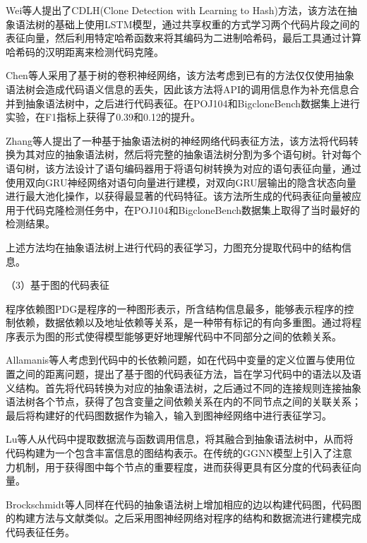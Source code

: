 Wei等人\cite{10.5555/3172077.3172312}提出了CDLH(Clone Detection with Learning to Hash)方法，该方法在抽象语法树的基础上使用LSTM模型，通过共享权重的方式学习两个代码片段之间的表征向量，然后利用特定哈希函数来将其编码为二进制哈希码，最后工具通过计算哈希码的汉明距离来检测代码克隆。

Chen等人\cite{10.1145/3310273.3321560}采用了基于树的卷积神经网络，该方法考虑到已有的方法仅仅使用抽象语法树会造成代码语义信息的丢失，因此该方法将API的调用信息作为补充信息合并到抽象语法树中，之后进行代码表征。在POJ104\cite{WOS:000485474201046}和BigcloneBench\cite{7332459}数据集上进行实验，在F1指标上获得了0.39和0.12的提升。

Zhang等人\cite{8812062}提出了一种基于抽象语法树的神经网络代码表征方法，该方法将代码转换为其对应的抽象语法树，然后将完整的抽象语法树分割为多个语句树。针对每个语句树，该方法设计了语句编码器用于将语句树转换为对应的语句表征向量，通过使用双向GRU神经网络对语句向量进行建模，对双向GRU层输出的隐含状态向量进行最大池化操作，以获得最显著的代码特征。该方法所生成的代码表征向量被应用于代码克隆检测任务中，在POJ104\cite{WOS:000485474201046}和BigcloneBench\cite{7332459}数据集上取得了当时最好的检测结果。

上述方法均在抽象语法树上进行代码的表征学习，力图充分提取代码中的结构信息。

（3）基于图的代码表征

程序依赖图PDG是程序的一种图形表示，所含结构信息最多，能够表示程序的控制依赖，数据依赖以及地址依赖等关系，是一种带有标记的有向多重图。通过将程序表示为图的形式使得模型能够更好地理解代码中不同部分之间的依赖关系。

Allamanis等人\cite{Allamanis2017LearningTR}考虑到代码中的长依赖问题，如在代码中变量的定义位置与使用位置之间的距离问题，提出了基于图的代码表征方法，旨在学习代码中的语法以及语义结构。首先将代码转换为对应的抽象语法树，之后通过不同的连接规则连接抽象语法树各个节点，获得了包含变量之间依赖关系在内的不同节点之间的关联关系；最后将构建好的代码图数据作为输入，输入到图神经网络中进行表征学习。

Lu等人\cite{Lu2019ProgramCU}从代码中提取数据流与函数调用信息，将其融合到抽象语法树中，从而将代码构建为一个包含丰富信息的图结构表示。在传统的GGNN模型上引入了注意力机制，用于获得图中每个节点的重要程度，进而获得更具有区分度的代码表征向量。

Brockschmidt等人\cite{Brockschmidt2018GenerativeCM}同样在代码的抽象语法树上增加相应的边以构建代码图，代码图的构建方法与文献\cite{Allamanis2017LearningTR}类似。之后采用图神经网络对程序的结构和数据流进行建模完成代码表征任务。

